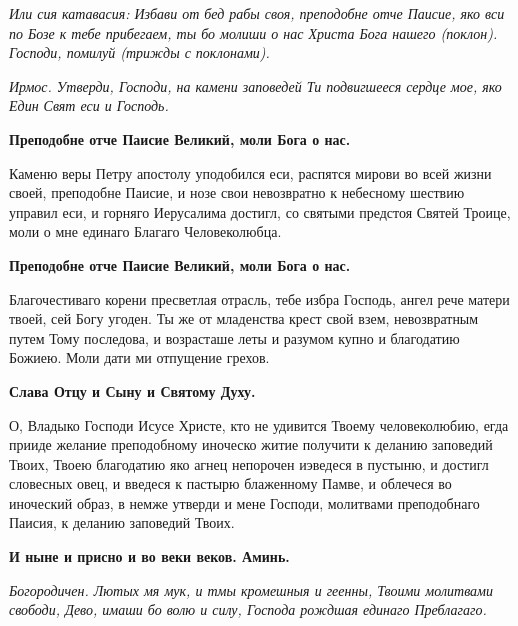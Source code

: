 \itshape Или сия катавасия:\normalfont{} Избави от бед рабы своя, преподобне отче Паисие, яко вси по Бозе к тебе прибегаем, ты бо молиши о нас Христа Бога нашего (\itshape поклон\normalfont{}). Господи, помилуй (\itshape трижды с поклонами\normalfont{}). 








\itshape Ирмос.\normalfont{} Утверди, Господи, на камени заповедей Ти подвигшееся сердце мое, яко Един Свят еси и Господь.




\bfseries Преподобне отче Паисие Великий, моли Бога о нас.\normalfont{}




Каменю веры Петру апостолу уподобился еси, распятся мирови во всей жизни своей, преподобне Паисие, и нозе свои невозвратно к небесному шествию управил еси, и горняго Иерусалима достигл, со святыми предстоя Святей Троице, моли о мне единаго Благаго Человеколюбца. 




\bfseries Преподобне отче Паисие Великий, моли Бога о нас. \normalfont{}


 Благочестиваго корени пресветлая отрасль, тебе избра Господь, ангел рече матери твоей, сей Богу угоден. Ты же от младенства крест свой взем, невозвратным путем Тому последова, и возрасташе леты и разумом купно и благодатию Божиею. Моли дати ми отпущение грехов. 




\bfseries Слава Отцу и Сыну и Святому Духу.\normalfont{}




О, Владыко Господи Исусе Христе, кто не удивится Твоему человеколюбию, егда прииде желание преподобному иноческо житие получити к деланию
заповедий Твоих, Твоею благодатию яко агнец непорочен иэведеся в пустыню, и достигл словесных овец, и введеся к пастырю блаженному
Памве, и облечеся во иноческий образ, в немже утверди и мене Господи, молитвами преподобнаго Паисия, к деланию заповедий Твоих. 




\bfseries И ныне и присно и во веки веков. Аминь.\normalfont{}




\itshape Богородичен.\normalfont{} Лютых мя мук, и тмы кромешныя и геенны, Твоими молитвами свободи, Дево, имаши бо волю и силу, Господа рождшая единаго Преблагаго. 




